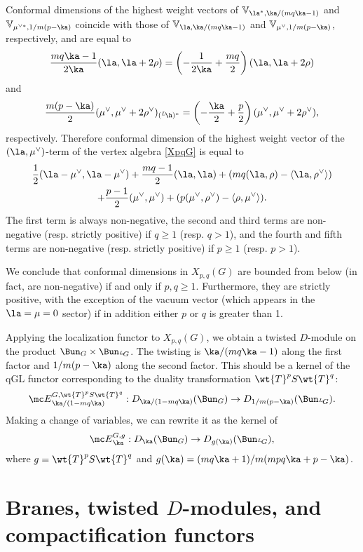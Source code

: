 \documentclass[11pt,reqno]{amsart}
\theoremstyle{plain}
\numberwithin{equation}{section}
\def\neg{\negthinspace}
\def\LG{{}^L\neg G}
\theoremstyle{definition}
\begin{document}
Conformal dimensions of the highest weight vectors of ${\mathbb
  V}_{\la^*,\ka/(mq\ka-1)}$ and ${\mathbb V}_{\mu^{\vee *},1/m(p-\ka)}$
coincide with those of ${\mathbb V}_{\la,\ka/(mq\ka-1)}$ and
${\mathbb V}_{\mu^\vee,1/m(p-\ka)}$, respectively, and are equal to
$$
\frac{mq\ka-1}{2\ka}(\la,\la+2\rho) = \left( -
  \frac{1}{2\ka} + \frac{mq}{2} \right) (\la,\la+2\rho)
$$
and
$$
\frac{m(p-\ka)}{2}(\mu^\vee,\mu^\vee+2\rho^\vee)_{({}^L\neg\h)^*} = \left(
  -\frac{\ka}{2} + \frac{p}{2} \right) (\mu^\vee,\mu^\vee+2\rho^\vee),
$$
respectively. Therefore conformal dimension of the highest weight
vector of the $(\la,\mu^\vee)$-term of the vertex algebra \eqref{XpqG}
is equal to
\begin{multline*}
\frac{1}{2}(\la-\mu^\vee,\la-\mu^\vee) + \frac{mq-1}{2}(\la,\la) +
(mq(\la,\rho) - \langle
\la,\rho^\vee \rangle) \\ + \frac{p-1}{2}(\mu^\vee,\mu^\vee) +
(p(\mu^\vee,\rho^\vee) - \langle \rho,\mu^\vee \rangle).
\end{multline*}
The first term is always non-negative, the second and third terms are
non-negative (resp. strictly positive) if $q\geq 1$ (resp. $q>1$), and
the fourth and fifth terms are non-negative (resp. strictly positive)
if $p\geq 1$ (resp. $p>1$).

We conclude that conformal dimensions in $X_{p,q}(G)$ are bounded from
below (in fact, are non-negative) if and only if $p, q \geq
1$. Furthermore, they are strictly positive, with the exception of the
vacuum vector (which appears in the $\la=\mu=0$ sector) if in addition
either $p$ or $q$ is greater than 1.

Applying the localization functor to $X_{p,q}(G)$, we obtain a
twisted $D$-module on the product $\Bun_{G} \times
\Bun_{\LG}$. The twisting is $\ka/(mq\ka-1)$ along the first factor
and $1/m(p-\ka)$ along the second factor. This should be a kernel of
the qGL functor corresponding to the duality transformation
$\wt{T}^{p} S \wt{T}^q$:
$$
{\mc E}^{G,\wt{T}^{p} S \wt{T}^q}_{\ka/(1-mq\ka)}:
D_{\ka/(1-mq\ka)}(\Bun_G) \to D_{1/m(p-\ka)}(\Bun_{\LG}).
$$
Making a change of variables, we can rewrite it as the kernel of
$$
{\mc E}^{G,g}_{\ka}: D_\ka(\Bun_G) \to
D_{g(\ka)}(\Bun_{\LG}),
$$
where $g = \wt{T}^{p} S \wt{T}^q$ and $g(\ka) =
(mq\ka+1)/m(mpq\ka+p-\ka)$.

\section{Branes, twisted $D$-modules, and compactification
  functors}    \label{stalks}
\end{document}
